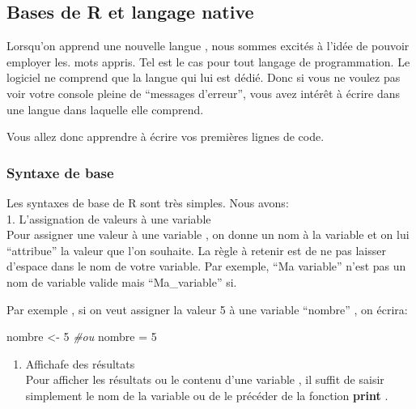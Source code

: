 \documentclass[
]{article}
\newenvironment{Shaded}{\begin{snugshade}}{\end{snugshade}}
\newcommand{\CommentTok}[1]{\textcolor[rgb]{0.56,0.35,0.01}{\textit{#1}}}
\newcommand{\DecValTok}[1]{\textcolor[rgb]{0.00,0.00,0.81}{#1}}
\newcommand{\NormalTok}[1]{#1}
\newcommand{\OtherTok}[1]{\textcolor[rgb]{0.56,0.35,0.01}{#1}}
\providecommand{\tightlist}{%
  \setlength{\itemsep}{0pt}\setlength{\parskip}{0pt}}
\begin{document}
\hypertarget{bases-de-r-et-langage-native}{%
\subsection{Bases de R et langage
native}\label{bases-de-r-et-langage-native}}

Lorsqu'on apprend une nouvelle langue , nous sommes excités à l'idée de
pouvoir employer les. mots appris. Tel est le cas pour tout langage de
programmation. Le logiciel ne comprend que la langue qui lui est dédié.
Donc si vous ne voulez pas voir votre console pleine de ``messages
d'erreur'', vous avez intérêt à écrire dans une langue dans laquelle
elle comprend.

Vous allez donc apprendre à écrire vos premières lignes de code.

\hypertarget{syntaxe-de-base}{%
\subsubsection{Syntaxe de base}\label{syntaxe-de-base}}

Les syntaxes de base de R sont très simples. Nous avons:\\
1. L'assignation de valeurs à une variable\\
Pour assigner une valeur à une variable , on donne un nom à la variable
et on lui ``attribue'' la valeur que l'on souhaite. La règle à retenir
est de ne pas laisser d'espace dans le nom de votre variable. Par
exemple, {``Ma variable''} n'est pas un nom de variable valide mais
{``Ma\_variable''} si.

Par exemple , si on veut assigner la valeur 5 à une variable ``nombre''
, on écrira:

\begin{Shaded}
\begin{Highlighting}[]
\NormalTok{nombre }\OtherTok{\textless{}{-}} \DecValTok{5}
\CommentTok{\#ou }
\NormalTok{nombre }\OtherTok{=} \DecValTok{5}
\end{Highlighting}
\end{Shaded}

\begin{enumerate}
\def\labelenumi{\arabic{enumi}.}
\setcounter{enumi}{1}
\tightlist
\item
  Affichafe des résultats\\
  Pour afficher les résultats ou le contenu d'une variable , il suffit
  de saisir simplement le nom de la variable ou de le précéder de la
  fonction \textbf{print} .
\end{enumerate}
\end{document}
